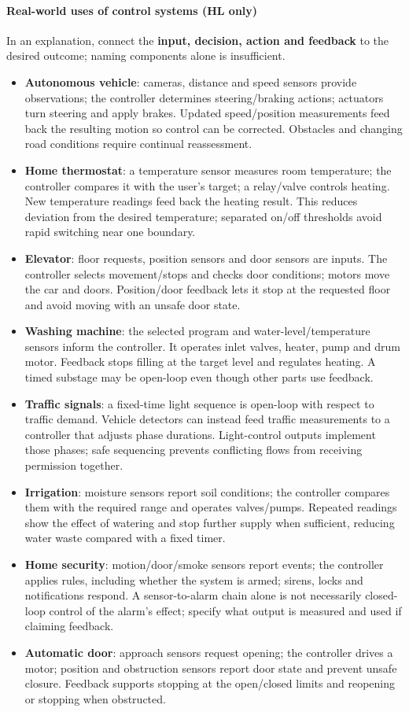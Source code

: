 \documentclass[a4paper,12pt]{article}
\begin{document}
\paragraph{Real-world uses of control systems (HL only)}
In an explanation, connect the \textbf{input, decision, action and feedback} to the desired outcome; naming components alone is insufficient.
\begin{itemize}
    \item \textbf{Autonomous vehicle}: cameras, distance and speed sensors provide observations; the controller determines steering/braking actions; actuators turn steering and apply brakes. Updated speed/position measurements feed back the resulting motion so control can be corrected. Obstacles and changing road conditions require continual reassessment.
    \item \textbf{Home thermostat}: a temperature sensor measures room temperature; the controller compares it with the user's target; a relay/valve controls heating. New temperature readings feed back the heating result. This reduces deviation from the desired temperature; separated on/off thresholds avoid rapid switching near one boundary.
    \item \textbf{Elevator}: floor requests, position sensors and door sensors are inputs. The controller selects movement/stops and checks door conditions; motors move the car and doors. Position/door feedback lets it stop at the requested floor and avoid moving with an unsafe door state.
    \item \textbf{Washing machine}: the selected program and water-level/temperature sensors inform the controller. It operates inlet valves, heater, pump and drum motor. Feedback stops filling at the target level and regulates heating. A timed substage may be open-loop even though other parts use feedback.
    \item \textbf{Traffic signals}: a fixed-time light sequence is open-loop with respect to traffic demand. Vehicle detectors can instead feed traffic measurements to a controller that adjusts phase durations. Light-control outputs implement those phases; safe sequencing prevents conflicting flows from receiving permission together.
    \item \textbf{Irrigation}: moisture sensors report soil conditions; the controller compares them with the required range and operates valves/pumps. Repeated readings show the effect of watering and stop further supply when sufficient, reducing water waste compared with a fixed timer.
    \item \textbf{Home security}: motion/door/smoke sensors report events; the controller applies rules, including whether the system is armed; sirens, locks and notifications respond. A sensor-to-alarm chain alone is not necessarily closed-loop control of the alarm's effect; specify what output is measured and used if claiming feedback.
    \item \textbf{Automatic door}: approach sensors request opening; the controller drives a motor; position and obstruction sensors report door state and prevent unsafe closure. Feedback supports stopping at the open/closed limits and reopening or stopping when obstructed.
\end{itemize}
\end{document}
